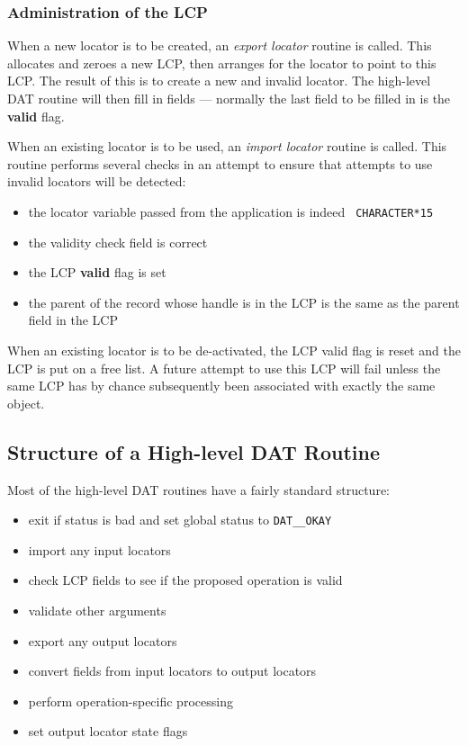 \subsubsection {Administration of the LCP}

When a new locator is to be created, an {\em export locator} routine is called.
This allocates and zeroes a new LCP, then arranges for the locator to point
to this LCP. The result of this is to create a new and invalid locator.
The high-level DAT routine will then fill in fields --- normally the last
field to be filled in is the {\bf valid} flag.

When an existing locator is to be used, an {\em import locator} routine
is called. This routine performs several checks in an attempt to ensure
that attempts to use invalid locators will be detected:

\begin {itemize}
\item the locator variable passed from the application is indeed {\tt
CHARACTER*15}
\item the validity check field is correct
\item the LCP {\bf valid} flag is set
\item the parent of the record whose handle is in the LCP is the same as
the parent field in the LCP
\end {itemize}

When an existing locator is to be de-activated, the LCP valid flag is reset
and the LCP is put on a free list. A future attempt to use this LCP will
fail unless the same LCP has by chance subsequently been associated with
exactly the same object.

\subsection {Structure of a High-level DAT Routine}

Most of the high-level DAT routines have a fairly standard structure:

\begin {itemize}
\item exit if status is bad and set global status to {\tt DAT\_\_OKAY}
\item import any input locators
\item check LCP fields to see if the proposed operation is valid
\item validate other arguments
\item export any output locators
\item convert fields from input locators to output locators
\item perform operation-specific processing
\item set output locator state flags
\end {itemize}

